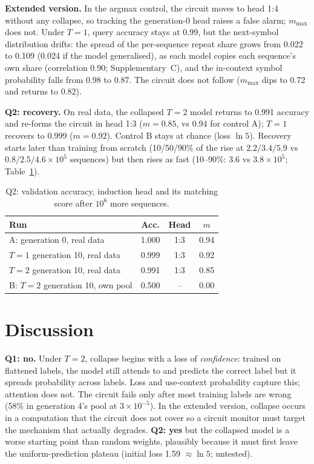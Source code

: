 \documentclass[10pt,letterpaper]{article}
\begin{document}
\textbf{Extended version.} In the argmax control, the circuit moves to head 1:4 without any collapse, so tracking the generation-0 head raises a false alarm; $m_{\max}$ does not. Under $T{=}1$, query accuracy stays at 0.99, but the next-symbol distribution drifts: the spread of the per-sequence repeat share grows from 0.022 to 0.109 (0.024 if the model generalised), as each model copies each sequence's own share (correlation 0.90; Supplementary~C), and the in-context symbol probability falls from 0.98 to 0.87. The circuit does not follow ($m_{\max}$ dips to 0.72 and returns to 0.82).

\textbf{Q2: recovery.} On real data, the collapsed $T{=}2$ model returns to 0.991 accuracy and re-forms the circuit in head 1:3 ($m{=}0.85$, vs 0.94 for control A); $T{=}1$ recovers to 0.999 ($m{=}0.92$). Control B stays at chance (loss $\ln 5$). Recovery starts later than training from scratch (10/50/90\% of the rise at $2.2/3.4/5.9$ vs $0.8/2.5/4.6\times10^5$ sequences) but then rises as fast (10--90\%: $3.6$ vs $3.8\times10^5$; Table~\ref{tab:q2}).

\setlength{\belowcaptionskip}{-7pt}
\begin{table}[h]
\centering
\captionsetup{font=sf, width=0.95\linewidth, skip=5pt}
\caption{ Q2: validation accuracy, induction head and its matching score after $10^6$ more sequences.}
\small
\begin{tabular}{lccc}
\toprule
Run & Acc. & Head & $m$\\
\midrule
A: generation 0, real data & 1.000 & 1:3 & 0.94\\
$T{=}1$ generation 10, real data & 0.999 & 1:3 & 0.92\\
$T{=}2$ generation 10, real data & 0.991 & 1:3 & 0.85\\
B: $T{=}2$ generation 10, own pool & 0.500 & -- & 0.00\\
\bottomrule
\end{tabular}
\label{tab:q2}
\end{table}
\setlength{\belowcaptionskip}{0pt}

\section{Discussion}
\textbf{Q1: no.} Under $T{=}2$, collapse begins with a loss of \emph{confidence}: trained on flattened labels, the model still attends to and predicts the correct label but it spreads probability across labels. Loss and use-context probability capture this; attention does not. The circuit fails only after most training labels are wrong (58\% in generation 4's pool at $3\times10^{-5}$). In the extended version, collapse occurs in a computation that the circuit does not cover so a circuit monitor must target the mechanism that actually degrades. \textbf{Q2: yes} but the collapsed model is a worse starting point than random weights, plausibly because it must first leave the uniform-prediction plateau (initial loss 1.59 ${\approx}\ln 5$; untested).
\end{document}
